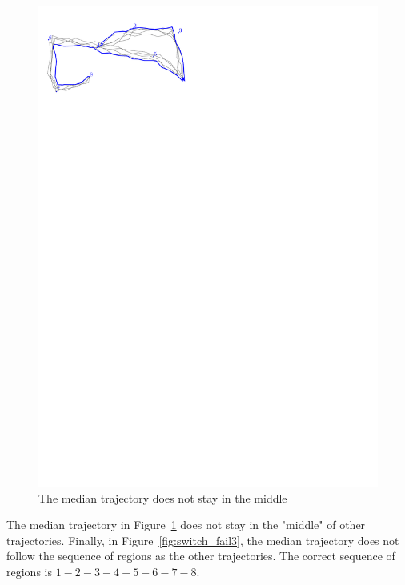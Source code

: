 \begin{figure}
\centering
\includegraphics[scale=1]{Gambar/switch_fail2}
\caption[The median trajectory does not stay in the middle \cite{Lionov:2009}]{The median trajectory does not stay in the middle \cite{Lionov:2009}} 
\label{fig:switch_fail2}
\end{figure} 

The median trajectory in Figure~\ref{fig:switch_fail2} does not stay in the "middle" of other trajectories.
Finally, in Figure~\ref{fig:switch_fail3}, the median trajectory does not follow the sequence of regions as the other trajectories. 
The correct sequence of regions is $1-2-3-4-5-6-7-8$.

